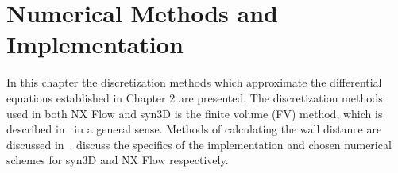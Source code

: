 \chapter{Numerical Methods and Implementation}
\label{chap:num}
In this chapter the discretization methods which approximate the differential equations established in Chapter 2 are presented. 
The discretization methods used in both NX Flow and syn3D is the finite volume (FV) method, which is described in~ in a general sense. Methods of calculating the wall distance are discussed in~.  discuss the specifics of the implementation and chosen numerical schemes for syn3D and NX Flow respectively. 
%
%




